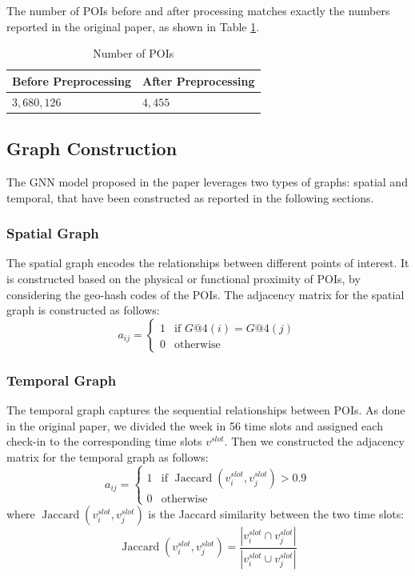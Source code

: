 \documentclass[twocolumn,twoside]{article}
\DeclareMathOperator{\jax}{Jaccard}
\begin{document}
The number of POIs before and after processing matches exactly
the numbers reported in the original paper, as shown in Table \ref{tab:poidata}.
\begin{table}
  \caption{Number of POIs}
  \centering
  \begin{tabular}{ll}
    \toprule
    Before Preprocessing & After Preprocessing \\
    \midrule
    \midrule
    $3,680,126$          & $4,455$             \\
    \bottomrule
  \end{tabular}
  \label{tab:poidata}
\end{table}

\subsection{Graph Construction}
The GNN model proposed in the paper leverages two types 
of graphs: spatial and temporal, that have been constructed
as reported in the following sections.
\subsubsection{Spatial Graph}
The spatial graph encodes the relationships between
different points of interest. It is constructed based on the
physical or functional proximity of POIs, by considering
the geo-hash codes of the POIs. The adjacency matrix for the
spatial graph is constructed as follows:
\begin{equation}
  a_{ij} = \begin{cases}
    1 & \text{if } G@4(i) = G@4(j) \\
    0 & \text{otherwise}
  \end{cases}
\end{equation}
\subsubsection{Temporal Graph}
The temporal graph captures the sequential relationships between
POIs. As done in the original paper,
we divided the week in 56 time slots and assigned each check-in to
the corresponding time slots $v^{slot}$. Then we constructed the adjacency matrix
for the temporal graph as follows:
\begin{equation}
  a_{ij} = \begin{cases}
    1 & \text{if } \jax(v^{slot}_i, v^{slot}_j) > 0.9 \\
    0 & \text{otherwise}
  \end{cases}
\end{equation}
where $\jax(v^{slot}_i, v^{slot}_j)$ is the Jaccard
similarity between the two time slots:
\begin{equation}
  \jax(v^{slot}_i, v^{slot}_j) = \frac{|v^{slot}_i \cap v^{slot}_j|}{|v^{slot}_i \cup v^{slot}_j|}
\end{equation}
\end{document}
